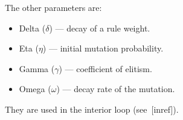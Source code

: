 The other parameters are:
\begin{itemize}
\item Delta ($\delta$) --- decay of a rule weight.
\item Eta ($\eta$) --- initial mutation probability.
\item Gamma ($\gamma$) --- coefficient of elitism.
\item Omega ($\omega$) --- decay rate of the mutation.
\end{itemize}

They are used in the interior loop (see~[inref]).

\begin{figure}
\end{figure}
